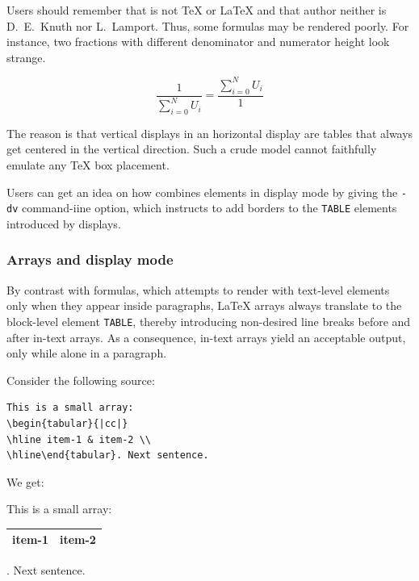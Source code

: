 Users should remember that \hevea{} is not \TeX{} or \LaTeX{} and that
\hevea{} author neither is D.~E.~Knuth nor L.~Lamport.
Thus, some formulas may be rendered poorly.
For instance, two fractions with different denominator and numerator
height look strange.
\begin{htmlonly}
$$
\frac{1}{\sum_{i=0}^{N}U_i} = \frac{\sum_{i=0}^{N}U_i}{1}
$$
\end{htmlonly}
\begin{center}
\end{center}
The reason is that vertical displays in an horizontal display are
\html{} tables
that always get centered in the vertical direction.
Such a crude model cannot  faithfully emulate any \TeX{} box placement.

Users can get an idea on how \hevea{} combines elements in display mode
by giving the \verb+-dv+  command-iine option, which
instructs \hevea{} to add
borders to the \verb+TABLE+ elements introduced by displays.

\subsubsection{Arrays and display mode}

By contrast with formulas, which \hevea{} attempts to render with
text-level elements only when they appear inside paragraphs, \LaTeX{} arrays
always translate to the
block-level element \verb+TABLE+, thereby introducing non-desired line
breaks before and after in-text arrays.
As a consequence, in-text arrays yield an acceptable output, only while
alone in a paragraph.

\begin{htmlonly}
Consider the following source:
\begin{verbatim}
This is a small array:
\begin{tabular}{|cc|}
\hline item-1 & item-2 \\
\hline\end{tabular}. Next sentence.
\end{verbatim}
We get:
\begin{htmlout}
This is a small array:
\begin{tabular}{|cc|}\hline item-1 & item-2
\\ \hline\end{tabular}. Next sentence.
\end{htmlout}
\end{htmlonly}

